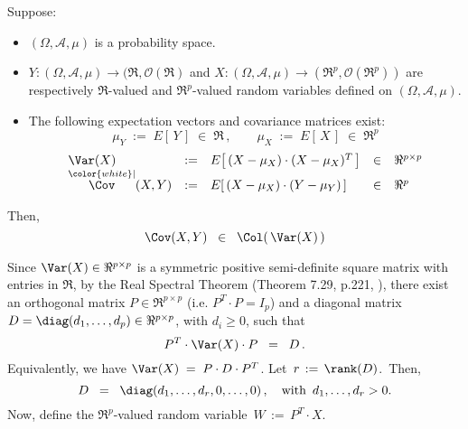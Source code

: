 \begin{lemma}\label{CovXYinColVarX}
\mbox{}\vskip 0.1cm
\noindent
Suppose:
\begin{itemize}
\item
	$(\Omega,\mathcal{A},\mu)$ is a probability space.
\item
	$Y : (\Omega,\mathcal{A},\mu) \longrightarrow (\Re,\mathcal{O}(\Re)$
	and
	$X : (\Omega,\mathcal{A},\mu) \longrightarrow (\Re^{p},\mathcal{O}(\Re^{p}))$
	are respectively $\Re$-valued and $\Re^{p}$-valued random variables
	defined on $(\Omega,\mathcal{A},\mu)$.
\item
	The following expectation vectors and covariance matrices exist:
	\begin{equation*}
	\mu_{Y} \;:=\; E\!\left[\,Y\,\right] \;\in\; \Re\,,
	\quad\quad
	\mu_{X} \;:=\; E\!\left[\,X\,\right] \;\in\; \Re^{p}
	\end{equation*}
	\begin{equation*}
	\begin{array}{lclcl}
	\Var\!\left(X\right)
		&:=& E\!\left[\,(X-\mu_{X}) \cdot (X-\mu_{X})^{T}\,\right]
		&\in& \Re^{p \times p}
	\\
	\overset{{\color{white}\vert}}{\Cov}\!\left(X,Y\right)
		&:=& E\!\left[\,(X-\mu_{X}) \cdot (Y-\mu_{Y})\,\right]
		&\in& \Re^{p}
	\end{array}
	\end{equation*}
\end{itemize}
Then,
\begin{equation*}
\Cov(X,Y) \;\; \in \;\; \Col\!\left(\,\Var(X)\,\right)
\end{equation*}
\end{lemma}
\proof
Since $\Var(X) \in \Re^{p \times p}$ is a symmetric positive semi-definite
square matrix with entries in $\Re$, by the Real Spectral Theorem
(Theorem 7.29, p.221, \cite{Axler2015}), there exist an
orthogonal matrix $P \in \Re^{p \times p}$ (i.e. $P^{T} \cdot P = I_{p}$) and
a diagonal matrix $D = \diag(d_{1},\ldots,d_{p})\in \Re^{p \times p}$,
with $d_{i} \geq 0$, such that
\begin{equation*}
P^{T} \cdot \Var(X) \cdot P \;\;=\;\; D \,.
\end{equation*}
Equivalently, we have $\Var(X) \;=\; P \cdot D \cdot P^{T}$.
Let \,$r \,:=\, \rank(D)$.\, Then,
\begin{equation*}
D \;\; = \;\; \diag(d_{1},\ldots,d_{r},0,\ldots,0)\,,
\quad
\textnormal{with \,$d_{1}, \ldots, d_{r} > 0$}.
\end{equation*}
Now, define the $\Re^{p}$-valued random variable \,$W \,:=\, P^{T} \cdot X$.

